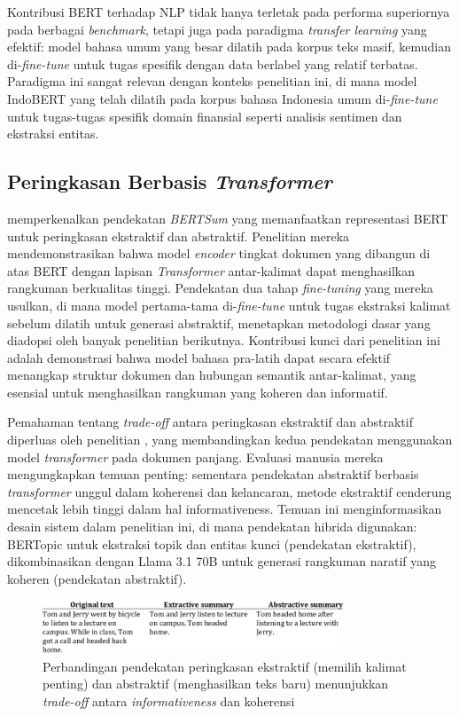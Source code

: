 Kontribusi BERT terhadap NLP tidak hanya terletak pada performa superiornya pada berbagai \textit{benchmark}, tetapi juga pada paradigma \textit{transfer learning} yang efektif: model bahasa umum yang besar dilatih pada korpus teks masif, kemudian di-\textit{fine-tune} untuk tugas spesifik dengan data berlabel yang relatif terbatas. Paradigma ini sangat relevan dengan konteks penelitian ini, di mana model IndoBERT yang telah dilatih pada korpus bahasa Indonesia umum di-\textit{fine-tune} untuk tugas-tugas spesifik domain finansial seperti analisis sentimen dan ekstraksi entitas.

\subsection{Peringkasan Berbasis \textit{Transformer}}

\textcite{liu2019bertsum} memperkenalkan pendekatan \textit{BERTSum} yang memanfaatkan representasi BERT untuk peringkasan ekstraktif dan abstraktif. Penelitian mereka mendemonstrasikan bahwa model \textit{encoder} tingkat dokumen yang dibangun di atas BERT dengan lapisan \textit{Transformer} antar-kalimat dapat menghasilkan rangkuman berkualitas tinggi. Pendekatan dua tahap \textit{fine-tuning} yang mereka usulkan, di mana model pertama-tama di-\textit{fine-tune} untuk tugas ekstraksi kalimat sebelum dilatih untuk generasi abstraktif, menetapkan metodologi dasar yang diadopsi oleh banyak penelitian berikutnya. Kontribusi kunci dari penelitian ini adalah demonstrasi bahwa model bahasa pra-latih dapat secara efektif menangkap struktur dokumen dan hubungan semantik antar-kalimat, yang esensial untuk menghasilkan rangkuman yang koheren dan informatif.

Pemahaman tentang \textit{trade-off} antara peringkasan ekstraktif dan abstraktif diperluas oleh penelitian \textcite{pilault2020}, yang membandingkan kedua pendekatan menggunakan model \textit{transformer} pada dokumen panjang. Evaluasi manusia mereka mengungkapkan temuan penting: sementara pendekatan abstraktif berbasis \textit{transformer} unggul dalam koherensi dan kelancaran, metode ekstraktif cenderung mencetak lebih tinggi dalam hal informativeness. Temuan ini menginformasikan desain sistem dalam penelitian ini, di mana pendekatan hibrida digunakan: BERTopic untuk ekstraksi topik dan entitas kunci (pendekatan ekstraktif), dikombinasikan dengan Llama 3.1 70B untuk generasi rangkuman naratif yang koheren (pendekatan abstraktif).

\begin{figure}[H]
  \centering
  \includegraphics[width=0.8\textwidth]{image/extractive-vs-abstractive.png}
  \caption{Perbandingan pendekatan peringkasan ekstraktif (memilih kalimat penting) dan abstraktif (menghasilkan teks baru) menunjukkan \textit{trade-off} antara \textit{informativeness} dan koherensi}
  \label{fig:extract-abstract}
\end{figure}


